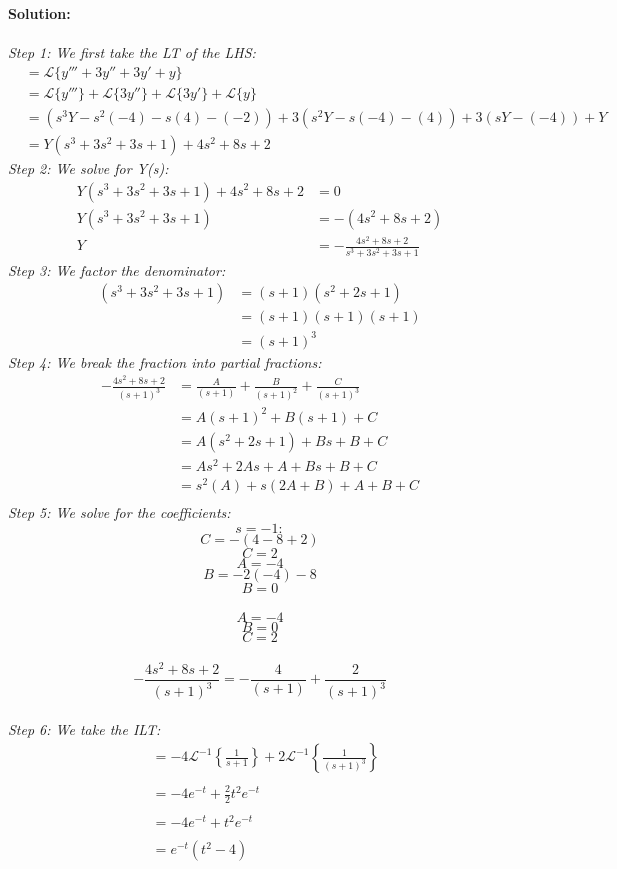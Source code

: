 \documentclass{article}
\begin{document}
    \textbf{Solution:} \\ \\
    \textit{Step 1: We first take the LT of the LHS:} 
    \begin{align*}
        &= \mathcal{L}\{y''' + 3y''+ 3y' + y\} \\
        &= \mathcal{L}\{y'''\} + \mathcal{L}\{3y''\} + \mathcal{L} \{3y'\} + \mathcal{L} \{y\} \\
        &= (s^{3}Y -s^{2}(-4) -s(4) -(-2)) + 3(s^{2}Y -s(-4) - (4)) + 3(sY - (-4)) + Y \\
        &= Y(s^{3} + 3s^{2} + 3s + 1) + 4s^{2} + 8s + 2
    \end{align*}
    \textit{Step 2: We solve for Y(s):} \\
    \begin{align*}
        Y(s^{3}  + 3s^{2} + 3s + 1) + 4s^{2} + 8s + 2 &= 0 \\
        Y(s^{3} + 3s^{2} + 3s + 1) &= -(4s^{2} + 8s + 2) \\
        Y &= -\frac{4s^{2} + 8s + 2}{s^{3}  + 3s^{2} + 3s + 1}
    \end{align*}
    \textit{Step 3: We factor the denominator:}
    \begin{align*}
        (s^{3}  + 3s^{2} + 3s + 1) &= (s + 1)(s^{2} + 2s + 1) \\
        &= (s + 1)(s + 1)(s + 1) \\
        &= (s + 1)^{3}
    \end{align*}
    \textit{Step 4: We break the fraction into partial fractions:}
    \begin{align*}
        -\frac{4s^{2} + 8s + 2}{(s + 1)^{3}} &= \frac{A}{(s + 1)} + \frac{B}{(s + 1)^{2}} + \frac{C}{(s + 1)^{3}} \\
        &= A(s + 1)^{2} + B(s + 1) + C \\
        &= A(s^{2} + 2s + 1) + Bs + B + C \\
        &= As^{2} + 2As + A + Bs + B + C \\
        &= s^{2}(A) + s(2A + B) + A + B + C \\ 
    \end{align*}
    \textit{Step 5: We solve for the coefficients:}
    $$s = -1:$$
    $$C = -(4 - 8 + 2)$$
    $$C = 2$$
    $$A = -4$$
    $$B = -2(-4) - 8$$
    $$B = 0$$
     \\
    $$A = -4$$ 
    $$B = 0$$ 
    $$C = 2$$ \\ 
    $$-\frac{4s^{2} + 8s + 2}{(s + 1)^{3}}= -\frac{4}{(s + 1)} + \frac{2}{(s + 1)^{3}}$$ \\
    \textit{Step 6: We take the ILT:}
    \begin{align*}
        &= -4\mathcal{L}^{-1}\left\{\frac{1}{s + 1}\right\} + 2\mathcal{L}^{-1} \left\{\frac{1}{(s + 1)^{3}}\right\} \\ \\
        &= -4e^{-t} + \frac{2}{2}t^{2}e^{-t} \\ \\
        &= -4e^{-t} + t^{2}e^{-t} \\ \\
        &= e^{-t}(t^{2} - 4)
    \end{align*}
\end{document}
